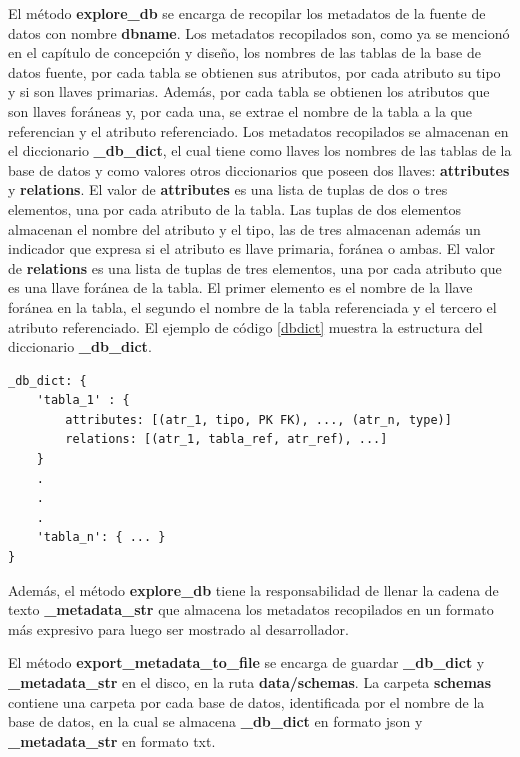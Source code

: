 El método \textbf{explore\_db} se encarga de recopilar los metadatos de la fuente de datos con nombre \textbf{dbname}. 
Los metadatos recopilados son, como ya se mencion\'o en el cap\'itulo de concepción y diseño, los nombres de las 
tablas de la base de datos fuente, por cada tabla se obtienen sus
atributos, por cada atributo su tipo y si son llaves primarias. Además, por cada tabla
se obtienen los atributos que son llaves foráneas y, por cada una, se extrae el nombre
de la tabla a la que referencian y el atributo referenciado. Los metadatos recopilados se almacenan en el diccionario 
\textbf{\_db\_dict}, el cual tiene como llaves los nombres de las tablas de la base 
de datos y como valores otros diccionarios que poseen dos llaves: \textbf{attributes} y \textbf{relations}. 
El valor de \textbf{attributes} es una lista de tuplas de dos o tres elementos, una por cada atributo de la tabla. 
Las tuplas de dos elementos almacenan el nombre del atributo y el tipo, las de tres almacenan además un indicador 
que expresa si el atributo es llave primaria, for\'anea o ambas. El valor de \textbf{relations} es una lista de 
tuplas de tres elementos, una por cada atributo que es una llave foránea de la tabla. El primer elemento es el nombre 
de la llave for\'anea en la tabla, el segundo el nombre de la tabla referenciada y el tercero el atributo referenciado. 
El ejemplo de c\'odigo \ref{dbdict} muestra la estructura del diccionario \textbf{\_db\_dict}. 

\begin{lstlisting}[label={dbdict}, caption={Estructura del diccionario \textbf{\_db\_dict}}]
_db_dict: {
    'tabla_1' : {
        attributes: [(atr_1, tipo, PK FK), ..., (atr_n, type)]
        relations: [(atr_1, tabla_ref, atr_ref), ...]
    }
    .
    .
    .
    'tabla_n': { ... }
}
\end{lstlisting}

Además, el método \textbf{explore\_db} tiene la responsabilidad de llenar la cadena de texto \textbf{\_metadata\_str} 
que almacena los metadatos recopilados en un formato m\'as expresivo para luego ser mostrado al desarrollador.

El método \textbf{export\_metadata\_to\_file} se encarga de guardar \textbf{\_db\_dict} y \textbf{\_metadata\_str} en el disco, 
en la ruta \textbf{data/schemas}. La carpeta \textbf{schemas} contiene una carpeta por cada base de datos, identificada 
por el nombre de la base de datos, en la cual se almacena \textbf{\_db\_dict} en formato json y 
\textbf{\_metadata\_str} en formato txt.

